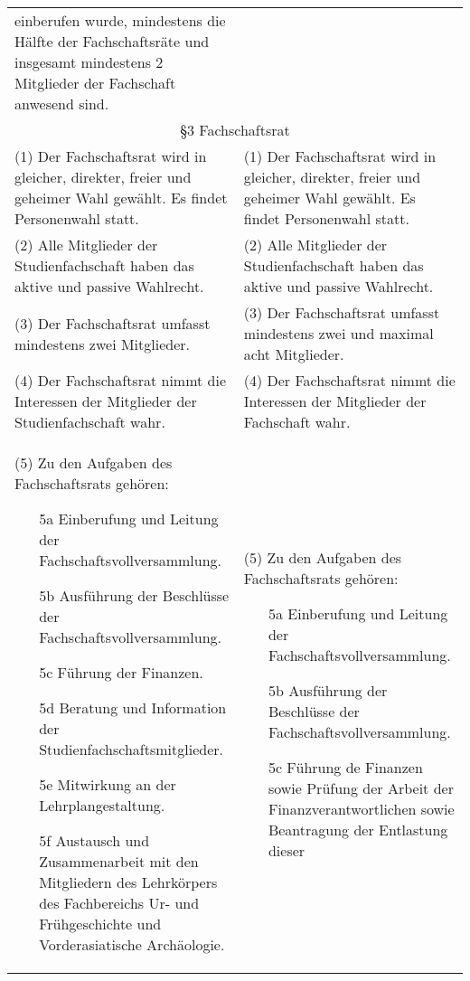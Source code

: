 {\begin{longtable}{|p{7.5cm}|p{7.5cm}|}
        einberufen wurde, mindestens die Hälfte der Fachschaftsräte und insgesamt mindestens
        2 Mitglieder der Fachschaft anwesend sind.\\
        \multicolumn{2}{|c|}{§3 Fachschaftsrat}\\\hline
        (1)  Der Fachschaftsrat wird in gleicher, direkter, freier und geheimer Wahl gewählt.
        Es findet Personenwahl statt.&(1)  Der Fachschaftsrat wird in gleicher, direkter, freier und geheimer Wahl gewählt.
        Es findet Personenwahl statt.\\
        (2)  Alle Mitglieder der Studienfachschaft haben das aktive und passive Wahlrecht.&(2)  Alle Mitglieder der Studienfachschaft haben das aktive und passive Wahlrecht.\\
        (3)  Der Fachschaftsrat umfasst mindestens zwei Mitglieder.&(3)  Der Fachschaftsrat umfasst mindestens zwei und maximal acht Mitglieder.\\
        (4)  Der Fachschaftsrat nimmt die Interessen der Mitglieder der Studienfachschaft wahr. & (4)  Der Fachschaftsrat nimmt die Interessen der Mitglieder der Fachschaft wahr.\\
        (5)  Zu den Aufgaben des Fachschaftsrats gehören:
        \begin{itemize}
        \item[5a]Einberufung und Leitung der Fachschaftsvollversammlung.
        \item[5b]Ausführung der Beschlüsse der Fachschaftsvollversammlung.
        \item[5c]Führung der Finanzen.
        \item[5d]Beratung und Information der Studienfachschaftsmitglieder.
        \item[5e]Mitwirkung an der Lehrplangestaltung.
        \item[5f]Austausch und Zusammenarbeit mit den Mitgliedern des Lehrkörpers des Fachbereichs Ur- und Frühgeschichte und Vorderasiatische Archäologie.    
        \end{itemize}&
        (5)  Zu den Aufgaben des Fachschaftsrats gehören:
        \begin{itemize}
        \item[5a]Einberufung und Leitung der Fachschaftsvollversammlung.
        \item[5b]Ausführung der Beschlüsse der Fachschaftsvollversammlung.
        \item[5c]Führung de Finanzen sowie Prüfung der Arbeit der Finanzverantwortlichen sowie
        Beantragung der Entlastung dieser

\end{itemize}
\end{longtable}}
